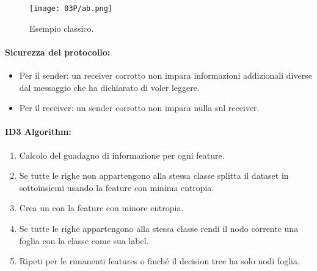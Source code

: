 


\begin{figure}[h]
    \centering
    \texttt{[image: 03P/ab.png]}
    \caption{Esempio classico.}
\end{figure}

\paragraph{Sicurezza del protocollo:}

\begin{itemize}
  \item Per il sender: un receiver corrotto non impara informazioni addizionali diverse dal messaggio che ha dichiarato di voler leggere. 
  \item Per il receiver: un sender corrotto non impara nulla sul receiver.
\end{itemize}

\paragraph{ID3 Algorithm:}

\begin{enumerate}
  \item Calcolo del guadagno di informazione per ogni feature. 
  \item Se tutte le righe non appartengono alla stessa classe splitta il dataset in sottoinsiemi usando la feature con minima entropia. 
  \item Crea un  con la feature con minore entropia. 
  \item Se tutte le righe appartengono alla stessa classe rendi il nodo corrente una foglia con la classe come sua label. 
  \item Ripeti per le rimanenti features o finché il decision tree ha solo nodi foglia.
\end{enumerate}

